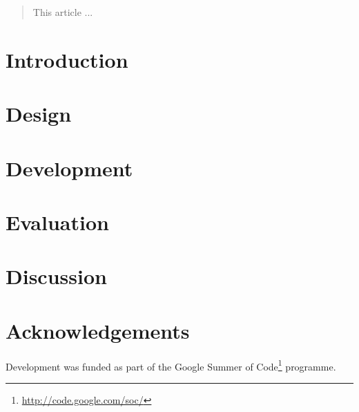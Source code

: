\documentclass[11pt]{article}
\title{}
\author{Jane Doe\\
  Department of Computer Science \\
  Nonesuch State University \\
  Utopia, NS 12345 \\
  {\tt jane.doe@cs.nsu.edu} \And
  John Smith \\
  Department of Linguistics \\
  Another State University \\
  Collegetown, AS 98765 \\  
  {\tt jsmith@ling.asu.edu}}
\date{}
\begin{document}
\maketitle

\begin{abstract}
  This article ...
\end{abstract}

\section{Introduction}

\citep{Dasgupta2005}

\section{Design}

\section{Development}

\section{Evaluation}

\section{Discussion}

\section*{Acknowledgements}

Development was funded as part of the Google Summer of Code\footnote{\url{http://code.google.com/soc/}} programme.



\end{document}

